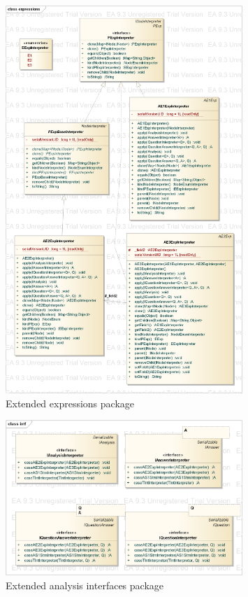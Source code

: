 \documentclass{overturerepchap}
\begin{document}
\begin{figure}[htb]
\centering
\includegraphics[width=0.8\textwidth]{figures/extended_expressions}
\caption{Extended expressions package}
\end{figure}

\begin{figure}[htb]
\centering
\includegraphics[width=0.8\textwidth]{figures/extended_analysis_interfaces}
\caption{Extended analysis interfaces package}
\end{figure}
\end{document}
